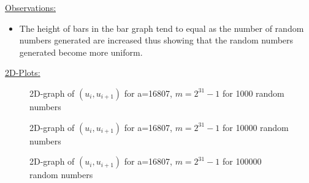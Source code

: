 \documentclass[11pt]{article}
\begin{document}
\underline{Observations:}
\begin{itemize}
\item The height of bars in the bar graph tend to equal as the number of random numbers generated are increased thus showing that the random numbers generated become more uniform.
\end{itemize}
\newpage
\underline{2D-Plots:}
\begin{figure}[H]
	\centering
	\caption{2D-graph of $(u_i,u_{i+1})$ for a=16807, $m=2^{31}-1$ for 1000 random numbers}
\end{figure}
\begin{figure}[H]
	\centering
	\caption{2D-graph of $(u_i,u_{i+1})$ for a=16807, $m=2^{31}-1$ for 10000 random numbers}
\end{figure}
\begin{figure}[H]
	\centering
	\caption{2D-graph of $(u_i,u_{i+1})$ for a=16807, $m=2^{31}-1$ for 100000 random numbers}
\end{figure}
\end{document}
